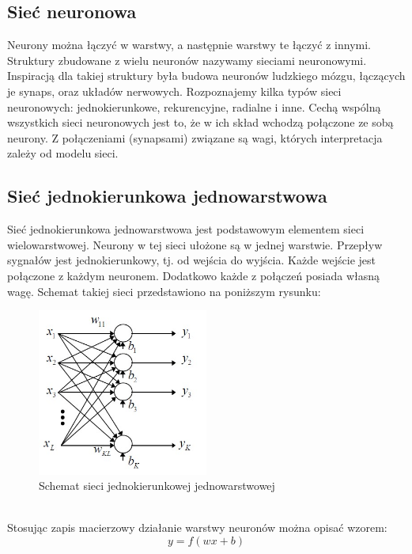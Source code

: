 \documentclass[a4paper, openright, twoside,11pt]{article}
\begin{document}
    \clearpage
    \subsection{Sieć neuronowa}
    Neurony można łączyć w warstwy, a następnie warstwy te łączyć z innymi. Struktury zbudowane z wielu neuronów nazywamy sieciami neuronowymi. Inspiracją dla takiej struktury była budowa neuronów ludzkiego mózgu, łączących je synaps, oraz układów nerwowych. Rozpoznajemy kilka typów sieci neuronowych: jednokierunkowe, rekurencyjne, radialne i inne. Cechą wspólną wszystkich sieci neuronowych jest to, że w ich skład wchodzą połączone ze sobą neurony. Z połączeniami (synapsami) związane są wagi, których interpretacja zależy od modelu sieci.
    
    \subsection{Sieć jednokierunkowa jednowarstwowa}
    Sieć jednokierunkowa jednowarstwowa jest podstawowym elementem sieci wielowarstwowej. Neurony w tej sieci ułożone są w jednej warstwie. Przepływ sygnałów jest jednokierunkowy, tj. od wejścia do wyjścia. Każde wejście jest połączone z każdym neuronem. Dodatkowo każde z połączeń posiada własną wagę. Schemat takiej sieci przedstawiono na poniższym rysunku:
    \begin{figure}[h]
        \centering
        \includegraphics[width=0.5\textwidth]{Grafika/schemat_1.jpg}
        \caption{Schemat sieci jednokierunkowej jednowarstwowej}
        \label{fig:SchematSieci1}
    \end{figure}\\
    Stosując zapis macierzowy działanie warstwy neuronów można opisać wzorem:
    \begin{equation} \label{dzialanie_jednowarstwowej}
    y = f\left(w x + b \right)
    \end{equation}
\end{document}
